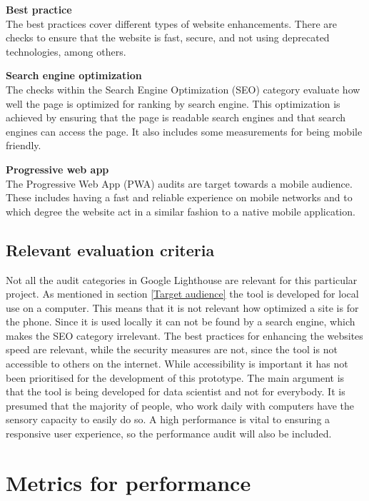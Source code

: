 \citep{LhAccess}

\textbf{Best practice}\\
The best practices cover different types of website enhancements. There are checks to ensure that the website is fast, secure, and not using deprecated technologies, among others. \citep{LhBP}

\textbf{Search engine optimization}\\
The checks within the Search Engine Optimization (SEO) category evaluate how well the page is optimized for ranking by search engine. This optimization is achieved by ensuring that the page is readable search engines and that search engines can access the page. It also includes some measurements for being mobile friendly.
\citep{LhSEO}

\textbf{Progressive web app}\\
The Progressive Web App (PWA) audits are target towards a mobile audience. These includes having a fast and reliable experience on mobile networks and to which degree the website act in a similar fashion to a native mobile application.
\citep{LhPWA}

\subsection{Relevant evaluation criteria}
 
Not all the audit categories in Google Lighthouse are relevant for this particular project. As mentioned in section \ref{Target audience}  the tool is developed for local use on a computer. This means that it is not relevant how optimized a site is for the phone. Since it is used locally it can not be found by a search engine, which makes the SEO category irrelevant. The best practices for enhancing the websites speed are relevant, while the security measures are not, since the tool is not accessible to others on the internet. While accessibility is important it has not been prioritised for the development of this prototype. The main argument is that the tool is being developed for data scientist and not for everybody. It is presumed that the majority of people, who work daily with computers have the sensory capacity to easily do so. A high performance is vital to ensuring a responsive user experience, so the performance audit will also be included.

\section{Metrics for performance}

